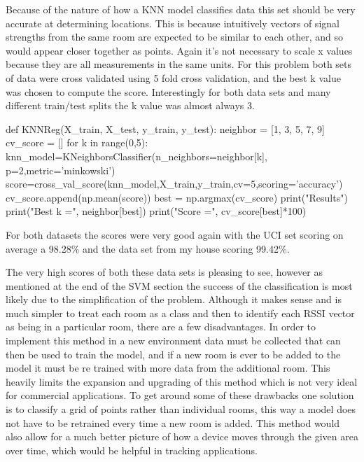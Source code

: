 \documentclass[12pt,letterpaper]{article}
\begin{document}

\par Because of the nature of how a KNN model classifies data this set should be very accurate at determining locations. This is because intuitively vectors of signal strengths from the same room are expected to be similar to each other, and so would appear closer together as points. Again it's not necessary to scale x values because they are all measurements in the same units. For this problem both sets of data were cross validated using 5 fold cross validation, and the best k value was chosen to compute the score. Interestingly for both data sets and many different train/test splits the k value was almost always 3.

\begin{python}
def KNNReg(X_train, X_test, y_train, y_test):
    neighbor = [1, 3, 5, 7, 9]
    cv_score = []
    for k in range(0,5):
        knn_model=KNeighborsClassifier(n_neighbors=neighbor[k],
            p=2,metric='minkowski')
        score=cross_val_score(knn_model,X_train,y_train,cv=5,scoring='accuracy')
        cv_score.append(np.mean(score))
    best = np.argmax(cv_score)
    print("\nKNN Results")
    print("Best k =", neighbor[best])
    print("Score =", cv_score[best]*100)
\end{python}

\par For both datasets the scores were very good again with the UCI set scoring on average a 98.28\% and the data set from my house scoring 99.42\%. 


\par The very high scores of both these data sets is pleasing to see, however as mentioned at the end of the SVM section the success of the classification is most likely due to the simplification of the problem. Although it makes sense and is much simpler to treat each room as a class and then to identify each RSSI vector as being in a particular room, there are a few disadvantages. In order to implement this method in a new environment data must be collected that can then be used to train the model, and if a new room is ever to be added to the model it must be re trained with more data from the additional room. This heavily limits the expansion and upgrading of this method which is not very ideal for commercial applications. To get around some of these drawbacks one solution is to classify a grid of points rather than individual rooms, this way a model does not have to be retrained every time a new room is added. This method would also allow for a much better picture of how a device moves through the given area over time, which would be helpful in tracking applications.
\end{document}

